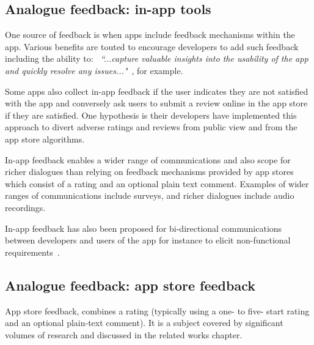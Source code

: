 \subsection{Analogue feedback: in-app tools}
One source of feedback is when apps include feedback mechanisms within the app. Various benefits are touted to encourage developers to add such feedback including the ability to: ~\emph{``...capture valuable insights into the usability of the app and quickly resolve any issues..."}~, for example. 

Some apps also collect in-app feedback if the user indicates they are not satisfied with the app and conversely ask users to submit a review online in the app store if they are satisfied. One hypothesis is their developers have implemented this approach to divert adverse ratings and reviews from public view and from the app store algorithms. 

In-app feedback enables a wider range of communications and also scope for richer dialogues than relying on feedback mechanisms provided by app stores which consist of a rating and an optional plain text comment. Examples of wider ranges of communications include surveys, and richer dialogues include audio recordings.

In-app feedback has also been proposed for bi-directional communications between developers and users of the app for instance to elicit non-functional requirements~.

\subsection{Analogue feedback: app store feedback}
App store feedback, combines a rating (typically using a one- to five- start rating and an optional plain-text comment). It is a subject covered by significant volumes of research and discussed in the related works chapter. %


